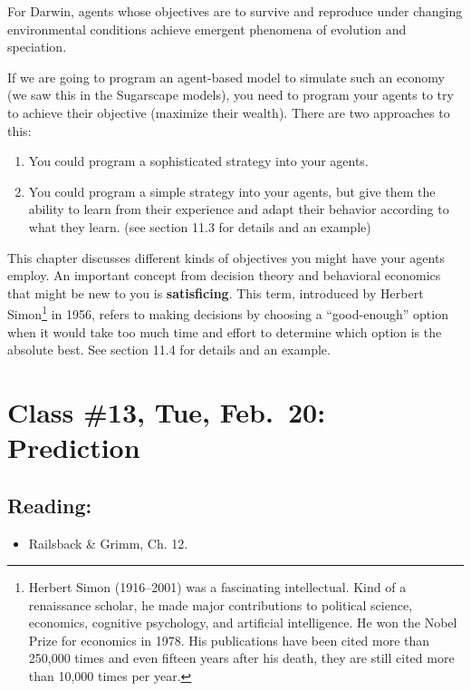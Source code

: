 \documentclass[]{article}
\providecommand{\tightlist}{%
  \setlength{\itemsep}{0pt}\setlength{\parskip}{0pt}}
\let\rmarkdownfootnote\footnote%
\def\footnote{\protect\rmarkdownfootnote}
\begin{document}
For Darwin, agents whose objectives are to survive and reproduce under
changing environmental conditions achieve emergent phenomena of
evolution and speciation.

If we are going to program an agent-based model to simulate such an
economy (we saw this in the Sugarscape models), you need to program your
agents to try to achieve their objective (maximize their wealth). There
are two approaches to this:

\begin{enumerate}
\def\labelenumi{\arabic{enumi}.}
\tightlist
\item
  You could program a sophisticated strategy into your agents.
\item
  You could program a simple strategy into your agents, but give them
  the ability to learn from their experience and adapt their behavior
  according to what they learn. (see section 11.3 for details and an
  example)
\end{enumerate}

This chapter discusses different kinds of objectives you might have your
agents employ. An important concept from decision theory and behavioral
economics that might be new to you is \textbf{satisficing}. This term,
introduced by Herbert Simon\footnote{Herbert Simon (1916--2001) was a
  fascinating intellectual. Kind of a renaissance scholar, he made major
  contributions to political science, economics, cognitive psychology,
  and artificial intelligence. He won the Nobel Prize for economics in
  1978. His publications have been cited more than 250,000 times and
  even fifteen years after his death, they are still cited more than
  10,000 times per year.} in 1956, refers to making decisions by
choosing a ``good-enough'' option when it would take too much time and
effort to determine which option is the absolute best. See section 11.4
for details and an example.

\hypertarget{class-13-tue-feb.20-prediction}{%
\section{Class \#13, Tue, Feb.~20:
Prediction}\label{class-13-tue-feb.20-prediction}}

\hypertarget{reading-12}{%
\subsection{Reading:}\label{reading-12}}

\begin{itemize}
\tightlist
\item
  Railsback \& Grimm, Ch. 12.
\end{itemize}
\end{document}
